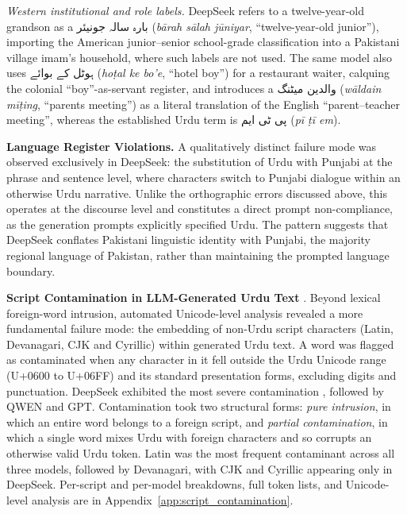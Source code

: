 \documentclass[11pt]{article}
\begin{document}
\textit{Western institutional and role labels.}
DeepSeek refers to a twelve-year-old grandson as a
\foreignlanguage{arabic}{بارہ سالہ جونیئر}
(\textit{bārah sālah jūniyar}, ``twelve-year-old
junior''), importing the American junior--senior
school-grade classification into a Pakistani village
imam's household, where such labels are not used.
The same model also uses
\foreignlanguage{arabic}{ہوٹل کے بوائے}
(\textit{hoṭal ke bo'e}, ``hotel boy'') for a
restaurant waiter, calquing the colonial
``boy''-as-servant register, and introduces a
\foreignlanguage{arabic}{والدین میٹنگ}
(\textit{wāldain mīṭing}, ``parents meeting'') as
a literal translation of the English
``parent--teacher meeting'', whereas the
established Urdu term is
\foreignlanguage{arabic}{پی ٹی ایم}
(\textit{pī ṭī em}).



\textbf{Language Register Violations. }A qualitatively distinct failure mode was observed 
exclusively in DeepSeek: the substitution of Urdu 
with Punjabi at the phrase and sentence level, where 
characters switch to Punjabi dialogue within an 
otherwise Urdu narrative. Unlike the orthographic 
errors discussed above, this operates at the 
discourse level and constitutes a direct prompt 
non-compliance, as the generation prompts explicitly 
specified Urdu. The pattern suggests that DeepSeek 
conflates Pakistani linguistic identity with Punjabi, 
the majority regional language of Pakistan, rather 
than maintaining the prompted language boundary.


\textbf{Script Contamination in LLM-Generated Urdu Text}
\label{subsec:script_contamination}. Beyond lexical foreign-word intrusion, automated
Unicode-level analysis revealed a more fundamental failure
mode: the embedding of non-Urdu script characters (Latin,
Devanagari, CJK and Cyrillic) within generated Urdu text. A
word was flagged as contaminated when any character in it
fell outside the Urdu Unicode range
(U+0600 to U+06FF) and its standard presentation forms,
excluding digits and punctuation. DeepSeek exhibited the
most severe contamination , followed by QWEN 
and GPT. Contamination took two
structural forms: \textit{pure intrusion}, in which an
entire word belongs to a foreign script, and
\textit{partial contamination}, in which a single word
mixes Urdu with foreign characters and so corrupts an
otherwise valid Urdu token. Latin was the most frequent
contaminant across all three models,
followed by Devanagari, with CJK and Cyrillic appearing
only in DeepSeek. Per-script and
per-model breakdowns, full token lists, and Unicode-level
analysis are in Appendix~\ref{app:script_contamination}.
\end{document}
